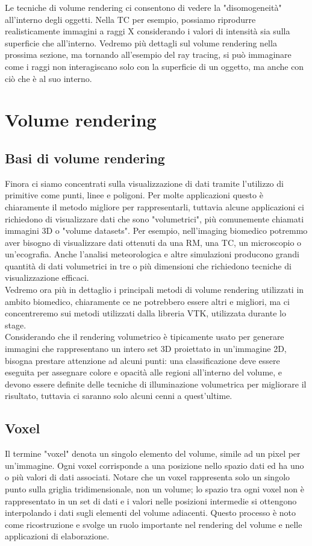 Le tecniche di volume rendering ci consentono di vedere la "disomogeneità" all'interno degli oggetti. Nella TC per esempio, possiamo riprodurre realisticamente immagini a raggi X considerando i valori di intensità sia sulla superficie che all'interno. Vedremo più dettagli sul volume rendering nella prossima sezione, ma tornando all'esempio del ray tracing, si può immaginare come i raggi non interagiscano solo con la superficie di un oggetto, ma anche con ciò che è al suo interno.

\section{Volume rendering}
\subsection{Basi di volume rendering}\label{sec:volume-rendering-details}
Finora ci siamo concentrati sulla visualizzazione di dati tramite l'utilizzo di primitive come punti, linee e poligoni. Per molte applicazioni questo è chiaramente il metodo migliore per rappresentarli, tuttavia alcune applicazioni ci richiedono di visualizzare dati che sono "volumetrici", più comunemente chiamati immagini 3D o "volume datasets". Per esempio, nell'imaging biomedico potremmo aver bisogno di visualizzare dati ottenuti da una RM, una TC, un microscopio o un'ecografia. Anche l'analisi meteorologica e altre simulazioni producono grandi quantità di dati volumetrici in tre o più dimensioni che richiedono tecniche di visualizzazione efficaci.
\\
Vedremo ora più in dettaglio i principali metodi di volume rendering utilizzati in ambito biomedico, chiaramente ce ne potrebbero essere altri e migliori, ma ci concentreremo sui metodi utilizzati dalla libreria VTK, utilizzata durante lo stage.
\\
Considerando che il rendering volumetrico è tipicamente usato per generare immagini che rappresentano un intero set 3D proiettato in un'immagine 2D, bisogna prestare attenzione ad alcuni punti: una classificazione deve essere eseguita per assegnare colore e opacità alle regioni all'interno del volume, e devono essere definite delle tecniche di illuminazione volumetrica per migliorare il risultato, tuttavia ci saranno solo alcuni cenni a quest'ultime.

\subsection{Voxel}
Il termine "voxel" denota un singolo elemento del volume, simile ad un pixel per un'immagine. Ogni voxel corrisponde a una posizione nello spazio dati ed ha uno o più valori di dati associati. Notare che un voxel rappresenta solo un singolo punto sulla griglia tridimensionale, non un volume; lo spazio tra ogni voxel non è rappresentato in un set di dati e i valori nelle posizioni intermedie si ottengono interpolando i dati sugli elementi del volume adiacenti. Questo processo è noto come ricostruzione e svolge un ruolo importante nel rendering del volume e nelle applicazioni di elaborazione.

